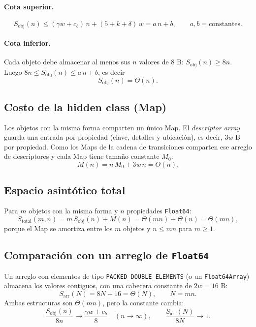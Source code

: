 \paragraph{Cota superior.}
\[
  S_{\mathrm{obj}}(n) \le (\gamma w + c_b)\,n + (5 + k + \delta)\,w
  = a\,n + b, \qquad a, b = \text{constantes}.
\]

\paragraph{Cota inferior.} Cada objeto debe almacenar al menos sus $n$ valores
de $8$ B: $S_{\mathrm{obj}}(n) \ge 8n$. Luego
$8n \le S_{\mathrm{obj}}(n) \le a\,n + b$, es decir
\[
  S_{\mathrm{obj}}(n) = \Theta(n).
\]

\subsection{Costo de la hidden class (Map)}

Los objetos con la misma forma comparten un único Map. El \emph{descriptor
array} guarda una entrada por propiedad (clave, detalles y ubicación), es
decir, $3w$ B por propiedad. Como los Maps de la cadena de transiciones
comparten ese arreglo de descriptores y cada Map tiene tamaño constante
$M_0$:
\[
  M(n) = n\,M_0 + 3w\,n = \Theta(n).
\]

\subsection{Espacio asintótico total}

Para $m$ objetos con la misma forma y $n$ propiedades \texttt{Float64}:
\[
  S_{\mathrm{total}}(m,n) = m\,S_{\mathrm{obj}}(n) + M(n)
  = \Theta(mn) + \Theta(n) = \Theta(mn),
\]
porque el Map se amortiza entre los $m$ objetos y $n \le mn$ para $m \ge 1$.

\subsection{Comparación con un arreglo de \texttt{Float64}}

Un arreglo con elementos de tipo \texttt{PACKED\_DOUBLE\_ELEMENTS} (o un
\texttt{Float64Array}) almacena los valores contiguos, con una cabecera
constante de $2w = 16$ B:
\[
  S_{\mathrm{arr}}(N) = 8N + 16 = \Theta(N), \qquad N = mn .
\]
Ambas estructuras son $\Theta(mn)$, pero la constante cambia:
\[
  \frac{S_{\mathrm{obj}}(n)}{8n} \longrightarrow \frac{\gamma w + c_b}{8}
  \quad (n \to \infty), \qquad
  \frac{S_{\mathrm{arr}}(N)}{8N} \longrightarrow 1 .
\]

